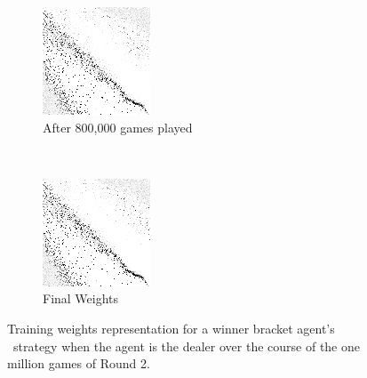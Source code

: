\begin{figure}
	\begin{subfigure}[b]{0.4\textwidth}
	\includegraphics[width=\linewidth]{images/findings/round2/flipbook/winner/checkpoint_800000.png}
	\caption{After 800,000 games played}
	\end{subfigure}
	~
	\begin{subfigure}[b]{0.4\textwidth}
	\includegraphics[width=\linewidth]{images/findings/round2/flipbook/winner/checkpoint_999999.png}
	\caption{Final Weights}
	\end{subfigure}

\caption{
	Training weights representation for a winner bracket agent's \handmaxavg\
	strategy when the agent is the dealer
	over the course of the one million games of Round 2.
}
\label{fig:r2-flip-winner}
\end{figure}
